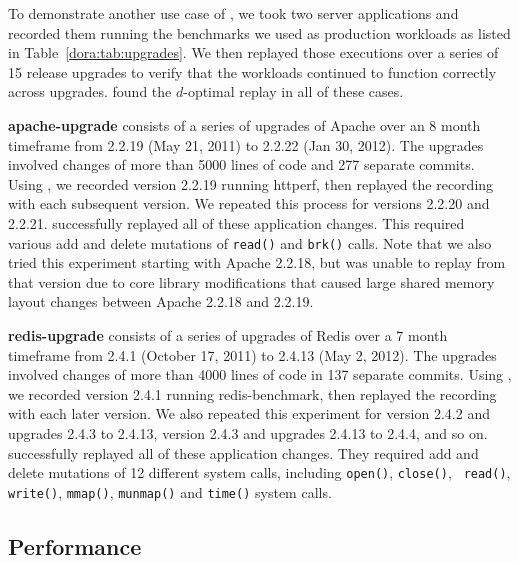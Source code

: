 To demonstrate another use case of {\dora}, we took two server applications
and recorded them running the benchmarks we used as production
workloads as listed in Table~\ref{dora:tab:upgrades}. We then replayed
those executions over a series of 15 release upgrades to verify that
the workloads continued to function correctly across upgrades. {\dora} found
the $d$-optimal replay in all of these cases.

{\bf apache-upgrade} consists of a series of upgrades of Apache over
an 8 month timeframe from 2.2.19 (May 21, 2011) to 2.2.22 (Jan 30,
2012). The upgrades involved changes of more than 5000 lines of code 
and 277 separate commits. Using {\dora}, we recorded version
2.2.19 running httperf, then replayed the recording with each subsequent
version. We repeated this process for versions 2.2.20 and 2.2.21.
{\dora} successfully replayed all of these
application changes. This required various add and delete mutations of
{\tt read()} and {\tt brk()} calls.  Note that we also tried
this experiment starting with Apache 2.2.18, but {\dora} was unable
to replay from that version due to core library modifications
that caused large shared memory layout changes between Apache 2.2.18
and 2.2.19.

{\bf redis-upgrade} consists of a series of upgrades of Redis over a
7 month timeframe from 2.4.1 (October 17, 2011) to 2.4.13 (May 2,
2012).  The upgrades involved changes of more than 4000 lines of code
in 137 separate commits.  Using {\dora}, we recorded version 2.4.1
running redis-benchmark, then replayed the recording with each later
version. We also repeated this experiment for version 2.4.2 and
upgrades 2.4.3 to 2.4.13, version 2.4.3 and upgrades 2.4.13 to 2.4.4, and so on.
{\dora} successfully replayed all of these
application changes. They required add and delete mutations of
12 different system calls, including {\tt open()}, {\tt close()}, {\tt
read()}, {\tt write()}, {\tt mmap()}, {\tt munmap()} and {\tt time()}
system calls.

\subsection{Performance}
\label{dora:sec:performance}

